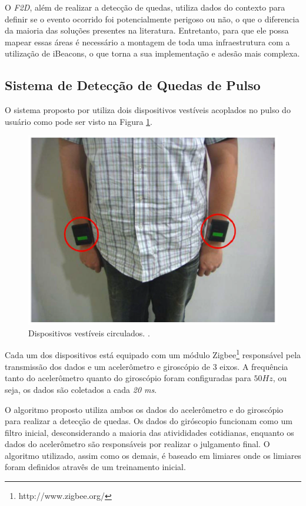 O \textit{F2D}, além de realizar a detecção de quedas, utiliza dados do contexto para definir se o evento ocorrido foi potencialmente perigoso ou não, o que o diferencia da maioria das soluções presentes na literatura. Entretanto, para que ele possa mapear essas áreas é necessário a montagem de toda uma infraestrutura com a utilização de iBeacons, o que torna a sua implementação e adesão mais complexa.


\subsection{Sistema de Detecção de Quedas de Pulso}
O sistema proposto por \cite{hsieh2014wrist} utiliza dois dispositivos vestíveis acoplados no pulso do usuário como pode ser visto na Figura \ref{fig:wrist_worn}. 


\begin{figure}[ht]
	\centering
	\includegraphics[scale=0.4]{imagens/wrist_worn.png}
	\caption{ Dispositivos vestíveis circulados. \citep{hsieh2014wrist}.}
	\label{fig:wrist_worn}
\end{figure} 


Cada um dos dispositivos está equipado com um módulo Zigbee\footnote{http://www.zigbee.org/} responsável pela transmissão dos dados e  um acelerômetro e  giroscópio de 3 eixos. A frequência tanto do acelerômetro quanto do giroscópio foram configuradas para $50 Hz$, ou seja, os dados são coletados a cada \textit{20 ms}.


O algoritmo proposto utiliza ambos os dados do acelerômetro e do giroscópio para realizar a detecção de quedas. Os dados do giróscopio funcionam como um filtro inicial, desconsiderando a maioria das ativididades cotidianas, enquanto os dados do acelerômetro são responsáveis por realizar o julgamento final. O algoritmo utilizado, assim como os demais, é baseado em limiares onde os limiares foram definidos atravês de um treinamento inicial. 

